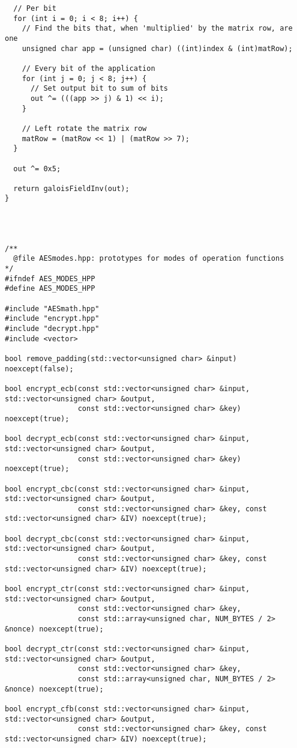 \documentclass[a4paper,12pt]{article}
\begin{document}
{\begin{lstlisting}
  // Per bit
  for (int i = 0; i < 8; i++) {
    // Find the bits that, when 'multiplied' by the matrix row, are one
    unsigned char app = (unsigned char) ((int)index & (int)matRow);

    // Every bit of the application
    for (int j = 0; j < 8; j++) {
      // Set output bit to sum of bits
      out ^= (((app >> j) & 1) << i);
    }

    // Left rotate the matrix row
    matRow = (matRow << 1) | (matRow >> 7);
  }

  out ^= 0x5;

  return galoisFieldInv(out);
}




/**
  @file AESmodes.hpp: prototypes for modes of operation functions
*/
#ifndef AES_MODES_HPP
#define AES_MODES_HPP

#include "AESmath.hpp"
#include "encrypt.hpp"
#include "decrypt.hpp"
#include <vector>

bool remove_padding(std::vector<unsigned char> &input) noexcept(false);

bool encrypt_ecb(const std::vector<unsigned char> &input, std::vector<unsigned char> &output,
                 const std::vector<unsigned char> &key) noexcept(true);

bool decrypt_ecb(const std::vector<unsigned char> &input, std::vector<unsigned char> &output,
                 const std::vector<unsigned char> &key) noexcept(true);

bool encrypt_cbc(const std::vector<unsigned char> &input, std::vector<unsigned char> &output,
                 const std::vector<unsigned char> &key, const std::vector<unsigned char> &IV) noexcept(true);

bool decrypt_cbc(const std::vector<unsigned char> &input, std::vector<unsigned char> &output,
                 const std::vector<unsigned char> &key, const std::vector<unsigned char> &IV) noexcept(true);

bool encrypt_ctr(const std::vector<unsigned char> &input, std::vector<unsigned char> &output,
                 const std::vector<unsigned char> &key,
                 const std::array<unsigned char, NUM_BYTES / 2> &nonce) noexcept(true);

bool decrypt_ctr(const std::vector<unsigned char> &input, std::vector<unsigned char> &output,
                 const std::vector<unsigned char> &key,
                 const std::array<unsigned char, NUM_BYTES / 2> &nonce) noexcept(true);

bool encrypt_cfb(const std::vector<unsigned char> &input, std::vector<unsigned char> &output,
                 const std::vector<unsigned char> &key, const std::vector<unsigned char> &IV) noexcept(true);


\end{lstlisting}}
\end{document}
